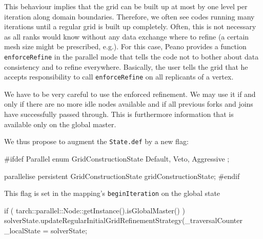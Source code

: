 This behaviour implies that the grid can be built up at most by one level per
iteration along domain boundaries.
Therefore, we often see codes running many iterations until a regular grid is
built up completely.
Often, this is not necessary as all ranks would know without any data
exchange where to refine (a certain mesh size might be prescribed, e.g.).
For this case, Peano provides a function \texttt{enforceRefine} in the parallel
mode that tells the code not to bother about data consistency and to refine 
everywhere. 
Basically, the user tells the grid that he accepts responsibility to call 
\texttt{enforceRefine} on all replicants of a vertex.

We have to be very careful to use the enforced refinement.
We may use it if and only if there are no more idle nodes available and if all
previous forks and joins have successfully passed through. 
This is furthermore information that is available only on the global master. 

We thus propose to augment the \texttt{State.def} by a new flag:
\begin{code}
  #ifdef Parallel
  enum GridConstructionState {
    Default, Veto, Aggressive
  };
  
  parallelise persistent GridConstructionState  gridConstructionState; 
  #endif
\end{code}

\noindent
This flag is set in the mapping's \texttt{beginIteration} on the global state
\begin{code}
  if ( tarch::parallel::Node::getInstance().isGlobalMaster() ) {
    solverState.updateRegularInitialGridRefinementStrategy(_traversalCounter%
  }
  _localState = solverState;
\end{code}

